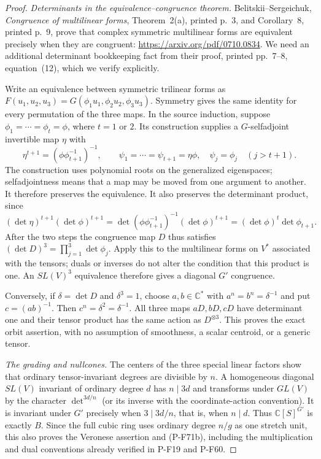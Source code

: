 \begin{proof}
\emph{Determinants in the equivalence--congruence theorem.}
Belitskii--Sergeichuk, \emph{Congruence of multilinear
forms}, Theorem~2(a), printed p.~3, and Corollary~8,
printed p.~9, prove that complex symmetric multilinear
forms are equivalent precisely when they are congruent:
\url{https://arxiv.org/pdf/0710.0834}.
We need an additional determinant bookkeeping fact from
their proof, printed pp.~7--8, equation~(12), which we
verify explicitly.

Write an equivalence between symmetric trilinear forms as
$F(u_1,u_2,u_3)=G(\phi_1u_1,\phi_2u_2,\phi_3u_3)$.
Symmetry gives the same identity for every permutation
of the three maps.  In the source induction, suppose
$\phi_1=\cdots=\phi_t=\phi$, where $t=1$ or $2$.
Its construction supplies a $G$-selfadjoint invertible
map $\eta$ with
\[
 \eta^{t+1}=(\phi\phi_{t+1}^{-1})^{-1},
 \qquad
 \psi_1=\cdots=\psi_{t+1}=\eta\phi,
 \quad \psi_j=\phi_j\quad(j>t+1).
\]
The construction uses polynomial roots on the generalized
eigenspaces; selfadjointness means that a map may be moved
from one argument to another.  It therefore preserves
the equivalence.  It also preserves the determinant product,
since
\[
 (\det\eta)^{t+1}(\det\phi)^{t+1}
   =\det(\phi\phi_{t+1}^{-1})^{-1}(\det\phi)^{t+1}
   =(\det\phi)^t\det\phi_{t+1}.
                                                               \tag{P-F71e}
\]
After the two steps the congruence map $D$ thus satisfies
$(\det D)^3=\prod_{j=1}^3\det\phi_j$.  Apply this to
the multilinear forms on $V^*$ associated with the tensors;
duals or inverses do not alter the condition that this
product is one.  An $SL(V)^3$ equivalence therefore gives
a diagonal $G'$ congruence.

Conversely, if $\delta=\det D$ and $\delta^3=1$, choose
$a,b\in\mathbb C^*$ with $a^n=b^n=\delta^{-1}$ and put
$c=(ab)^{-1}$.  Then $c^n=\delta^2=\delta^{-1}$.
All three maps $aD,bD,cD$ have determinant one and their
tensor product has the same action as $D^{\otimes3}$.
This proves the exact orbit assertion, with no assumption
of smoothness, a scalar centroid, or a generic tensor.

\emph{The grading and nullcones.}
The centers of the three special linear factors show
that ordinary tensor-invariant degrees are divisible by
$n$.  A homogeneous diagonal $SL(V)$ invariant of
ordinary degree $d$ has $n\mid3d$ and transforms under
$GL(V)$ by the character $\det^{3d/n}$ (or its inverse
with the coordinate-action convention).  It is invariant
under $G'$ precisely when $3\mid3d/n$, that is, when
$n\mid d$.  Thus $\mathbb C[S]^{G'}$ is exactly $B$.
Since the full cubic ring uses ordinary degree $n/g$ as
one stretch unit, this also proves the Veronese assertion
and (P-F71b), including the multiplication and dual
conventions already verified in P-F19 and P-F60.


\end{proof}
